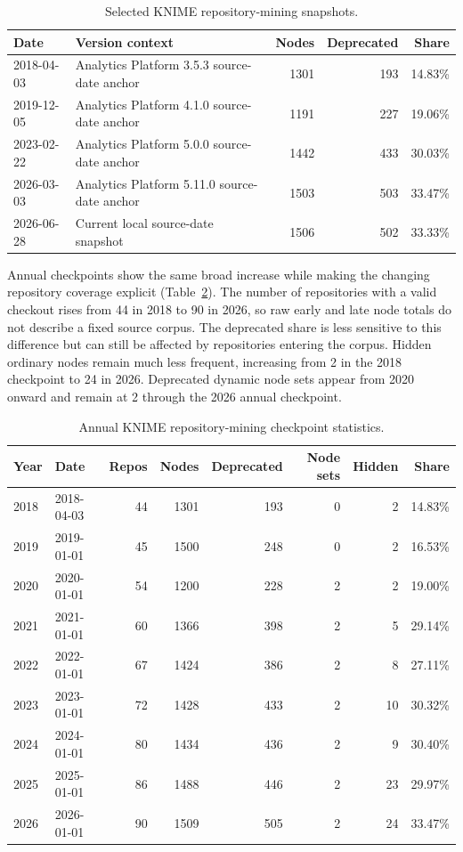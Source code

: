 \documentclass[runningheads]{llncs}
\begin{document}
\begin{table}
\centering
\caption{Selected KNIME repository-mining snapshots.}
\label{tab:selected-snapshots}
\scriptsize
\begin{tabular}{lp{}rrr}
\toprule
Date & Version context & Nodes & Deprecated & Share \\
\midrule
2018-04-03 & Analytics Platform 3.5.3 source-date anchor & 1301 & 193 & 14.83\% \\
2019-12-05 & Analytics Platform 4.1.0 source-date anchor & 1191 & 227 & 19.06\% \\
2023-02-22 & Analytics Platform 5.0.0 source-date anchor & 1442 & 433 & 30.03\% \\
2026-03-03 & Analytics Platform 5.11.0 source-date anchor & 1503 & 503 & 33.47\% \\
2026-06-28 & Current local source-date snapshot & 1506 & 502 & 33.33\% \\
\bottomrule
\end{tabular}
\end{table}

Annual checkpoints show the same broad increase while making the changing
repository coverage explicit (Table~\ref{tab:annual-snapshots}). The number of
repositories with a valid checkout rises from 44 in 2018 to 90 in 2026, so raw
early and late node totals do not describe a fixed source corpus. The deprecated
share is less sensitive to this difference but can still be affected by
repositories entering the corpus. Hidden ordinary nodes remain much less
frequent, increasing from 2
in the 2018 checkpoint to 24 in 2026. Deprecated dynamic node sets appear from
2020 onward and remain at 2 through the 2026 annual checkpoint.

\begin{table}
\centering
\caption{Annual KNIME repository-mining checkpoint statistics.}
\label{tab:annual-snapshots}
\scriptsize
\begin{tabular}{llrrrrrr}
\toprule
Year & Date & Repos & Nodes & Deprecated & Node sets & Hidden & Share \\
\midrule
2018 & 2018-04-03 & 44 & 1301 & 193 & 0 & 2 & 14.83\% \\
2019 & 2019-01-01 & 45 & 1500 & 248 & 0 & 2 & 16.53\% \\
2020 & 2020-01-01 & 54 & 1200 & 228 & 2 & 2 & 19.00\% \\
2021 & 2021-01-01 & 60 & 1366 & 398 & 2 & 5 & 29.14\% \\
2022 & 2022-01-01 & 67 & 1424 & 386 & 2 & 8 & 27.11\% \\
2023 & 2023-01-01 & 72 & 1428 & 433 & 2 & 10 & 30.32\% \\
2024 & 2024-01-01 & 80 & 1434 & 436 & 2 & 9 & 30.40\% \\
2025 & 2025-01-01 & 86 & 1488 & 446 & 2 & 23 & 29.97\% \\
2026 & 2026-01-01 & 90 & 1509 & 505 & 2 & 24 & 33.47\% \\
\bottomrule
\end{tabular}
\end{table}
\end{document}
